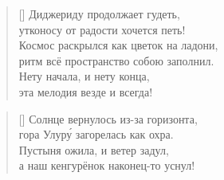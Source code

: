 \documentclass[a5paper,11pt]{memoir}
\begin{document}

\vspace{11cm}
\begin{verse}[\versewidth]
\hspace{1cm}Диджериду продолжает гудеть,\\
\hspace{1cm}утконосу от радости хочется петь!\\
\hspace{1cm}Космос раскрылся как цветок на ладони,\\
\hspace{1cm}ритм всё пространство собою заполнил.\\
\hspace{1cm}Нету начала, и нету конца,\\
\hspace{1cm}эта мелодия везде и всегда!
\end{verse}
\newpage


\begin{verse}[\versewidth]
Солнце вернулось из-за горизонта,\\
гора Улур\'{у} загорелась как охра.\\
Пустыня ожила, и ветер задул,\\
а наш кенгурёнок наконец-то уснул!
\end{verse}
\end{document}
